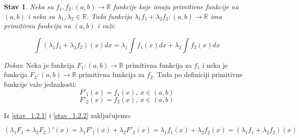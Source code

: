 \documentclass{article}
\newtheorem{stav}{Stav}[section]
\begin{document}
\begin{stavbox}
    \begin{stav}
        Neka su $f_1, f_2 : (a, b) \longrightarrow \mathbb{R}$
        funkcije koje imaju primitivne funkcije na $(a, b)$ i neka
        su $\lambda_1 , \lambda_2 \in \mathbb{R}$. Tada funkcija
        $\lambda_1 f_1 + \lambda_2 f_2 : (a, b) \longrightarrow
            \mathbb{R}$ ima primitivnu funkciju na $(a, b)$ i važi:\par
        $$\int (\lambda_1 f_1 + \lambda_2 f_2)(x)dx = \lambda_1\int
            f_1(x) dx + \lambda_2\int f_2(x) dx$$
    \end{stav}
\end{stavbox}
\setcounter{equation}{0}
\textit{Dokaz}: Neka je funkcija $F_1: (a, b) \longrightarrow \mathbb{R}$
primitivna funkcija za $f_1$ i neka je funkcija $F_2: (a, b)
    \longrightarrow \mathbb{R}$ primitivna funkcija za $f_2$.
Tada po definiciji primitivne funkcije važe jednakosti:
\begin{equation} \label{stav_1.2.1}
    F'_1(x) = f_1(x),\ x \in (a, b)
\end{equation}
\begin{equation} \label{stav_1.2.2}
    F'_2(x) = f_2(x),\ x \in (a, b)
\end{equation}

Iz \eqref{stav_1.2.1} i \eqref{stav_1.2.2} zaključujemo:

\begin{equation} \label{stav_1.2.3}
    (\lambda_1 F_1 + \lambda_2 F_2)'(x) =
    \lambda_1 F'_1(x) + \lambda_2 F'_2(x) =
    \lambda_1 f_1(x) + \lambda_2 f_2(x) =
    (\lambda_1 f_1 + \lambda_2 f_2)(x)
\end{equation}
\end{document}
